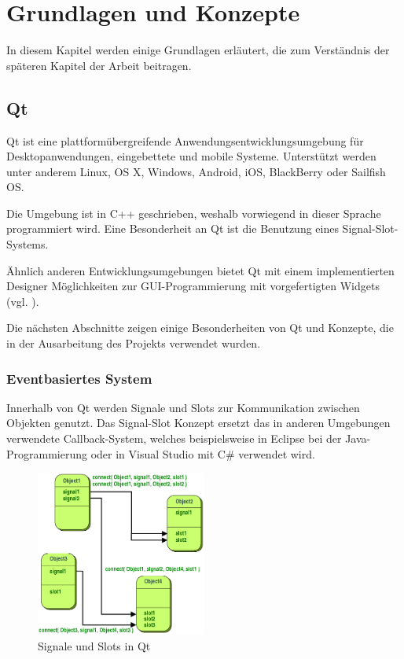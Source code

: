 
\chapter{Grundlagen und Konzepte}
\label{sec:Grundlagen}

In diesem Kapitel werden einige Grundlagen erläutert, die zum Verständnis der späteren Kapitel der Arbeit beitragen. 

\section{Qt}

Qt ist eine plattformübergreifende Anwendungsentwicklungsumgebung für Desktopanwendungen, eingebettete und mobile Systeme. Unterstützt werden unter anderem Linux, OS X,  Windows, Android, iOS, BlackBerry oder Sailfish OS. 

Die Umgebung ist in C++ geschrieben, weshalb vorwiegend in dieser Sprache programmiert wird. Eine Besonderheit an Qt ist die Benutzung eines Signal-Slot-Systems. 

Ähnlich anderen Entwicklungsumgebungen bietet Qt mit einem implementierten Designer Möglichkeiten zur GUI-Programmierung mit vorgefertigten Widgets (vgl. \cite{qt_allgemein}).

Die nächsten Abschnitte zeigen einige Besonderheiten von Qt und Konzepte, die in der Ausarbeitung des Projekts verwendet wurden. 

\subsection{Eventbasiertes System}
\label{sec:Eventbasiert}

Innerhalb von Qt werden Signale und Slots zur Kommunikation zwischen Objekten genutzt. Das Signal-Slot Konzept ersetzt das in anderen Umgebungen verwendete Callback-System, welches beispielsweise in Eclipse bei der Java-Programmierung oder in Visual Studio mit C\# verwendet wird. 

\begin{figure}[htb]
    \centering
    \includegraphics[width=0.5\textwidth]{Abbildungen/signalslots.png}
    \caption[Signale und Slots in Qt \newline Quelle: \textit{https://doc.qt.io/qt-5/signalsandslots.html}]{Signale und Slots in Qt}		
    \label{fig:signalslots}
\end{figure}

